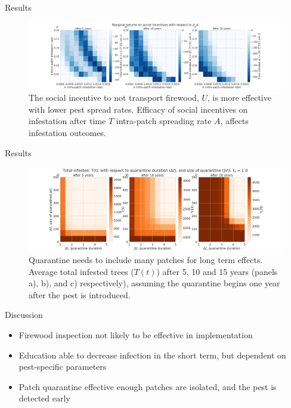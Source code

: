 \documentclass{beamer}
\begin{document}
\begin{frame}{Results}
    \begin{figure}
        \includegraphics[width=\textwidth]{firewood/A_v_ct_v_d_marginal_gain.png}
        \caption{The social incentive to not transport firewood, $U$, is more effective with lower pest spread rates. Efficacy of social incentives on infestation after time $T$ intra-patch spreading rate $A$, affects infestation outcomes.}
    \end{figure}
\end{frame}
\begin{frame}{Results}
    \begin{figure}
        \includegraphics[width=\textwidth]{firewood/node_quarantine_plot_1.0.png}
        \caption{Quarantine needs to include many patches for long term effects. Average total infested trees ($T(t)$) after 5, 10 and 15 years (panels a), b), and c) respectively), assuming the quarantine begins one year after the pest is introduced.}
    \end{figure}
\end{frame}

\begin{frame}{Discussion}
    \begin{itemize}
        \item Firewood inspection not likely to be effective in implementation
        \item Education able to decrease infection in the short term, but dependent on pest-specific parameters
        \item Patch quarantine effective enough patches are isolated, and the pest is detected early 
    \end{itemize}
\end{frame}
\end{document}
